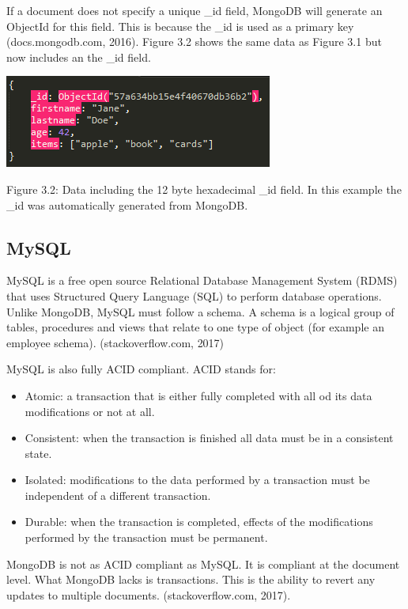 \documentclass[12pt]{article}
\begin{document}
If a document does not specify a unique {\_}id field, MongoDB will generate an ObjectId for this field. This is because the {\_}id is used as a primary key (docs.mongodb.com, 2016). Figure 3.2 shows the same data as Figure 3.1 but now includes an the {\_}id field. 

\begin{center}
	\includegraphics[scale=1]{json_id.PNG}
	
	Figure 3.2: Data including the 12 byte hexadecimal {\_}id field. In this example the {\_}id was automatically generated from MongoDB. 
\end{center}

\begin{center}
\subsection{MySQL}
\end{center}
MySQL is a free open source Relational Database Management System (RDMS) that uses Structured Query Language (SQL) to perform database operations. Unlike MongoDB, MySQL must follow a schema. A schema is a logical group of tables, procedures and views that relate to one type of object (for example an employee schema). (stackoverflow.com, 2017)

MySQL is also fully ACID compliant. ACID stands for: 
\begin{itemize}
	\item Atomic: a transaction that is either fully completed with all od its data modifications or not at all.
	\item Consistent: when the transaction is finished all data must be in a consistent state.
	\item Isolated: modifications to the  data performed by a transaction must be independent of a different transaction.
	\item Durable: when the transaction is completed, effects of the modifications performed by the transaction must be permanent.
\end{itemize}

MongoDB is not as ACID compliant as MySQL. It is compliant at the document level. What MongoDB lacks is transactions. This is the ability to revert any updates to multiple documents. (stackoverflow.com, 2017).
\end{document}
